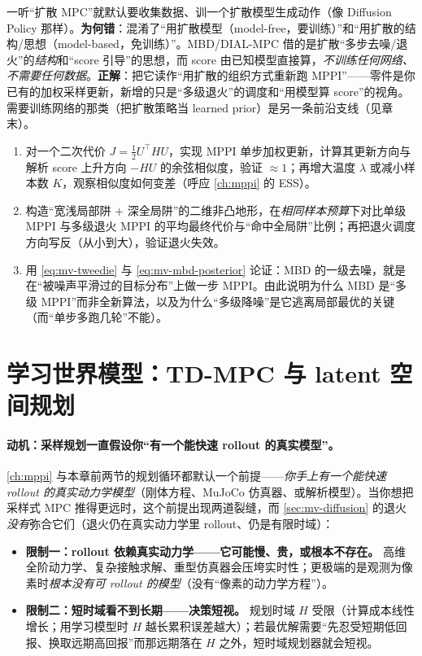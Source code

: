 \begin{pitfall}
一听“扩散 MPC”就默认要收集数据、训一个扩散模型生成动作（像 Diffusion Policy 那样）。\textbf{为何错}：混淆了“用扩散模型（model-free，要训练）”和“用扩散的结构/思想（model-based，免训练）”。MBD/DIAL-MPC 借的是扩散“多步去噪/退火”的\emph{结构}和“score 引导”的思想，而 score 由已知模型直接算，\emph{不训练任何网络、不需要任何数据}。\textbf{正解}：把它读作“用扩散的组织方式重新跑 MPPI”——零件是你已有的加权采样更新，新增的只是“多级退火”的调度和“用模型算 score”的视角。需要训练网络的那类（把扩散策略当 learned prior）是另一条前沿支线（见章末）。
\end{pitfall}

\begin{practice}
\begin{enumerate}
  \item 对一个二次代价 $J=\tfrac12 U^\top H U$，实现 MPPI 单步加权更新，计算其更新方向与解析 score 上升方向 $-HU$ 的余弦相似度，验证 $\approx1$；再增大温度 $\lambda$ 或减小样本数 $K$，观察相似度如何变差（呼应 \cref{ch:mppi} 的 ESS）。
  \item 构造“宽浅局部阱 $+$ 深全局阱”的二维非凸地形，在\emph{相同样本预算}下对比单级 MPPI 与多级退火 MPPI 的平均最终代价与“命中全局阱”比例；再把退火调度方向写反（从小到大），验证退火失效。
  \item 用 \cref{eq:mv-tweedie} 与 \cref{eq:mv-mbd-posterior} 论证：MBD 的一级去噪，就是在“被噪声平滑过的目标分布”上做一步 MPPI。由此说明为什么 MBD 是“多级 MPPI”而非全新算法，以及为什么“多级降噪”是它逃离局部最优的关键（而“单步多跑几轮”不能）。
\end{enumerate}
\end{practice}

\section{学习世界模型：TD-MPC 与 latent 空间规划}
\label{sec:mv-tdmpc}

\paragraph{动机：采样规划一直假设你“有一个能快速 rollout 的真实模型”。}
\cref{ch:mppi} 与本章前两节的规划循环都默认一个前提——\emph{你手上有一个能快速 rollout 的真实动力学模型}（刚体方程、MuJoCo 仿真器、或解析模型）。当你想把采样式 MPC 推得更远时，这个前提出现两道裂缝，而 \cref{sec:mv-diffusion} 的退火\emph{没有}弥合它们（退火仍在真实动力学里 rollout、仍是有限时域）：
\begin{itemize}
  \item \textbf{限制一：rollout 依赖真实动力学——它可能慢、贵，或根本不存在。} 高维全阶动力学、复杂接触求解、重型仿真器会压垮实时性；更极端的是观测为像素时\emph{根本没有可 rollout 的模型}（没有“像素的动力学方程”）。
  \item \textbf{限制二：短时域看不到长期——决策短视。} 规划时域 $H$ 受限（计算成本线性增长；用学习模型时 $H$ 越长累积误差越大）；若最优解需要“先忍受短期低回报、换取远期高回报”而那远期落在 $H$ 之外，短时域规划器就会短视。
\end{itemize}

